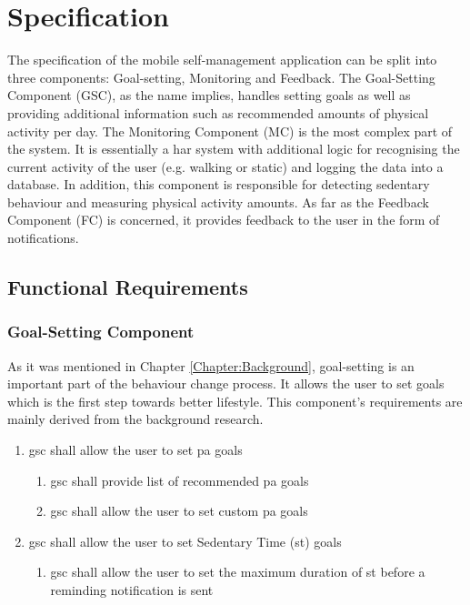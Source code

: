 \chapter{Specification}
\label{Chapter:Specification}

The specification of the mobile self-management application can be split into three components: Goal-setting, Monitoring and Feedback. The Goal-Setting Component (GSC), as the name implies, handles setting goals as well as providing additional information such as recommended amounts of physical activity per day. The Monitoring Component (MC) is the most complex part of the system. It is essentially a \gls{har} system with additional logic for recognising the current activity of the user (e.g. walking or static) and logging the data into a database. In addition, this component is responsible for detecting sedentary behaviour and measuring physical activity amounts. As far as the Feedback Component (FC) is concerned, it provides feedback to the user in the form of notifications. 
\section{Functional Requirements}

    \subsection{Goal-Setting Component}
    As it was mentioned in Chapter \ref{Chapter:Background},  goal-setting is an important part of the behaviour change process. It allows the user to set goals which is the first step towards better lifestyle. This component's requirements are mainly derived from the background research. 
    
    \begin{enumerate}
        \item \gls{gsc} shall allow the user to set \gls{pa} goals
        \begin{enumerate}
            \item \gls{gsc} shall provide list of recommended \gls{pa} goals
            \item \gls{gsc} shall allow the user to set custom \gls{pa} goals
        \end{enumerate}
        \item \gls{gsc} shall allow the user to set Sedentary Time (\gls{st}) goals
        \begin{enumerate}
            \item \gls{gsc} shall allow the user to set the maximum duration of \gls{st} before a reminding notification is sent 
        \end{enumerate}
    \end{enumerate}
    
